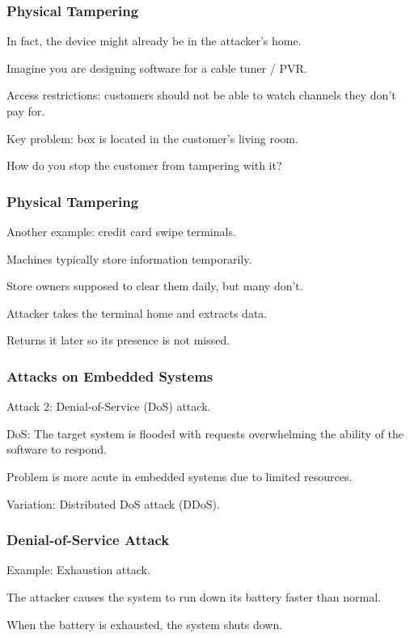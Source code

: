 \begin{frame}
\frametitle{Physical Tampering}
\begin{changemargin}{1cm}

In fact, the device might already be in the attacker's home.

Imagine you are designing software for a cable tuner / PVR.

Access restrictions: customers should not be able to watch channels they don't pay for.

Key problem: box is located in the customer's living room.

How do you stop the customer from tampering with it?

\end{changemargin}
\end{frame}

\begin{frame}
\frametitle{Physical Tampering}
\begin{changemargin}{1cm}

Another example: credit card swipe terminals.

Machines typically store information temporarily.

Store owners supposed to clear them daily, but many don't.

Attacker takes the terminal home and extracts data.

Returns it later so its presence is not missed.

\end{changemargin}
\end{frame}


\begin{frame}
\frametitle{Attacks on Embedded Systems}
\begin{changemargin}{1cm}

Attack 2: Denial-of-Service (DoS) attack.

DoS: The target system is flooded with requests overwhelming the ability of the software to respond.

Problem is more acute in embedded systems due to limited resources.

Variation: Distributed DoS attack (DDoS).

\end{changemargin}
\end{frame}

\begin{frame}
\frametitle{Denial-of-Service Attack}
\begin{changemargin}{1cm}

Example: Exhaustion attack.

The attacker causes the system to run down its battery faster than normal. 

When the battery is exhausted, the system shuts down.

\end{changemargin}
\end{frame}


